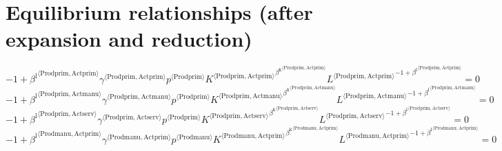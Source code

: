 \section{Equilibrium relationships (after expansion and reduction)}

\begin{equation}
-1 + {{\beta^{\mathrm{l}}}^{\langle \mathrm{\mathrm{Prodprim}},\mathrm{\mathrm{Actprim}}\rangle}} {{\gamma}^{\langle \mathrm{\mathrm{Prodprim}},\mathrm{\mathrm{Actprim}}\rangle}} {{p}^{\langle \mathrm{Prodprim}\rangle}} {{{K}^{\langle \mathrm{Prodprim},\mathrm{Actprim}\rangle}}^{{\beta^{\mathrm{k}}}^{\langle \mathrm{\mathrm{Prodprim}},\mathrm{\mathrm{Actprim}}\rangle}}} {{{L}^{\langle \mathrm{Prodprim},\mathrm{Actprim}\rangle}}^{-1 + {\beta^{\mathrm{l}}}^{\langle \mathrm{\mathrm{Prodprim}},\mathrm{\mathrm{Actprim}}\rangle}}} = 0
\end{equation}
\begin{equation}
-1 + {{\beta^{\mathrm{l}}}^{\langle \mathrm{\mathrm{Prodprim}},\mathrm{\mathrm{Actmanu}}\rangle}} {{\gamma}^{\langle \mathrm{\mathrm{Prodprim}},\mathrm{\mathrm{Actmanu}}\rangle}} {{p}^{\langle \mathrm{Prodprim}\rangle}} {{{K}^{\langle \mathrm{Prodprim},\mathrm{Actmanu}\rangle}}^{{\beta^{\mathrm{k}}}^{\langle \mathrm{\mathrm{Prodprim}},\mathrm{\mathrm{Actmanu}}\rangle}}} {{{L}^{\langle \mathrm{Prodprim},\mathrm{Actmanu}\rangle}}^{-1 + {\beta^{\mathrm{l}}}^{\langle \mathrm{\mathrm{Prodprim}},\mathrm{\mathrm{Actmanu}}\rangle}}} = 0
\end{equation}
\begin{equation}
-1 + {{\beta^{\mathrm{l}}}^{\langle \mathrm{\mathrm{Prodprim}},\mathrm{\mathrm{Actserv}}\rangle}} {{\gamma}^{\langle \mathrm{\mathrm{Prodprim}},\mathrm{\mathrm{Actserv}}\rangle}} {{p}^{\langle \mathrm{Prodprim}\rangle}} {{{K}^{\langle \mathrm{Prodprim},\mathrm{Actserv}\rangle}}^{{\beta^{\mathrm{k}}}^{\langle \mathrm{\mathrm{Prodprim}},\mathrm{\mathrm{Actserv}}\rangle}}} {{{L}^{\langle \mathrm{Prodprim},\mathrm{Actserv}\rangle}}^{-1 + {\beta^{\mathrm{l}}}^{\langle \mathrm{\mathrm{Prodprim}},\mathrm{\mathrm{Actserv}}\rangle}}} = 0
\end{equation}
\begin{equation}
-1 + {{\beta^{\mathrm{l}}}^{\langle \mathrm{\mathrm{Prodmanu}},\mathrm{\mathrm{Actprim}}\rangle}} {{\gamma}^{\langle \mathrm{\mathrm{Prodmanu}},\mathrm{\mathrm{Actprim}}\rangle}} {{p}^{\langle \mathrm{Prodmanu}\rangle}} {{{K}^{\langle \mathrm{Prodmanu},\mathrm{Actprim}\rangle}}^{{\beta^{\mathrm{k}}}^{\langle \mathrm{\mathrm{Prodmanu}},\mathrm{\mathrm{Actprim}}\rangle}}} {{{L}^{\langle \mathrm{Prodmanu},\mathrm{Actprim}\rangle}}^{-1 + {\beta^{\mathrm{l}}}^{\langle \mathrm{\mathrm{Prodmanu}},\mathrm{\mathrm{Actprim}}\rangle}}} = 0
\end{equation}
